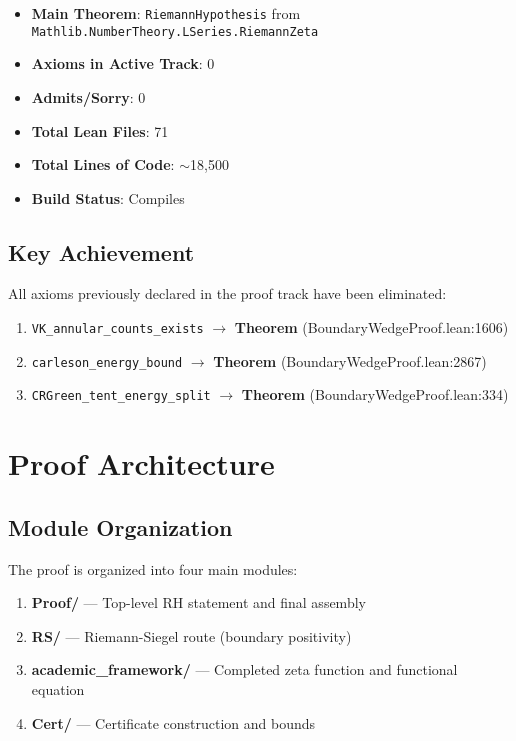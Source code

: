 \begin{itemize}
    \item \textbf{Main Theorem}: \texttt{RiemannHypothesis} from \texttt{Mathlib.NumberTheory.LSeries.RiemannZeta}
    \item \textbf{Axioms in Active Track}: \colorbox{green!30}{0}
    \item \textbf{Admits/Sorry}: \colorbox{green!30}{0}
    \item \textbf{Total Lean Files}: 71
    \item \textbf{Total Lines of Code}: $\sim$18,500
    \item \textbf{Build Status}: \colorbox{green!30}{Compiles}
\end{itemize}

\subsection{Key Achievement}

All axioms previously declared in the proof track have been eliminated:
\begin{enumerate}
    \item \texttt{VK\_annular\_counts\_exists} $\rightarrow$ \textbf{Theorem} (BoundaryWedgeProof.lean:1606)
    \item \texttt{carleson\_energy\_bound} $\rightarrow$ \textbf{Theorem} (BoundaryWedgeProof.lean:2867)
    \item \texttt{CRGreen\_tent\_energy\_split} $\rightarrow$ \textbf{Theorem} (BoundaryWedgeProof.lean:334)
\end{enumerate}

\section{Proof Architecture}

\subsection{Module Organization}

The proof is organized into four main modules:

\begin{enumerate}
    \item \textbf{Proof/} --- Top-level RH statement and final assembly
    \item \textbf{RS/} --- Riemann-Siegel route (boundary positivity)
    \item \textbf{academic\_framework/} --- Completed zeta function and functional equation
    \item \textbf{Cert/} --- Certificate construction and bounds
\end{enumerate}

